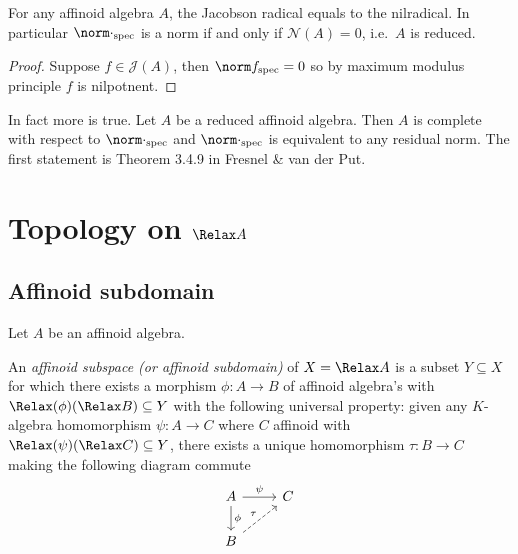 \documentclass[a4paper]{article}
\let\Sp\Relax
\DeclareMathOperator{\Sp}{Sp} %
\begin{document}
\begin{corollary}
  For any affinoid algebra \(A\), the Jacobson radical equals to the nilradical. In particular \(\norm \cdot_{\mathrm{spec}}\) is a norm if and only if \(\mathcal N(A) = 0\), i.e.\ \(A\) is reduced.
\end{corollary}

\begin{proof}
  Suppose \(f \in \mathcal J(A)\), then \(\norm f_{\mathrm{spec}} = 0\) so by maximum modulus principle \(f\) is nilpotnent.
\end{proof}

\begin{remark}
  In fact more is true. Let \(A\) be a reduced affinoid algebra. Then \(A\) is complete with respect to \(\norm \cdot_{\mathrm{spec}}\) and \(\norm \cdot_{\mathrm{spec}}\) is equivalent to any residual norm. The first statement is Theorem 3.4.9 in Fresnel \& van der Put.
\end{remark}

\section{Topology on \(\Sp A\)}

\subsection{Affinoid subdomain}

Let \(A\) be an affinoid algebra.

\begin{definition}
  An \emph{affinoid subspace (or affinoid subdomain)} of \(X = \Sp A\) is a subset \(Y \subseteq X\) for which there exists a morphism \(\phi: A \to B\) of affinoid algebra's with \(\Sp(\phi) (\Sp B) \subseteq Y\) with the following universal property: given any \(K\)-algebra homomorphism \(\psi: A \to C\) where \(C\) affinoid with \(\Sp(\psi)(\Sp C) \subseteq Y\), there exists a unique homomorphism \(\tau: B \to C\) making the following diagram commute
  \[
    \begin{tikzcd}
      A \ar[r, "\psi"] \ar[d, "\phi"] & C \\
      B \ar[ur, dashed, "\tau"]
    \end{tikzcd}
  \]
\end{definition}
\end{document}
